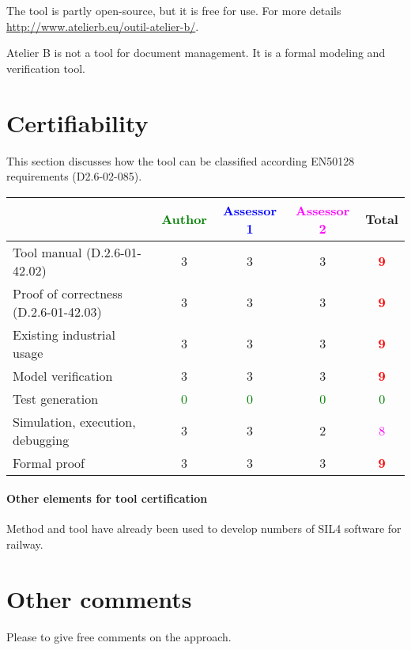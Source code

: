 \begin{author_comment}
The tool is partly open-source, but it is free for use.
For more details \url{http://www.atelierb.eu/outil-atelier-b/}.
\end{author_comment}


\begin{assessor2}
Atelier B is not a tool for document management. It is a formal modeling and verification tool.
\end{assessor2}

\section{Certifiability}

This section discusses how the tool can be classified according EN50128 requirements (D2.6-02-085).


\begin{tabular}{|l | c | c | c | c|}
\hline
& \textcolor{green}{Author} & \textcolor{blue}{Assessor 1} & \textcolor{magenta}{Assessor 2} & Total \\
\hline 
Tool manual (D.2.6-01-42.02) & 3     & 3     & 3     & \textcolor{red}{\textbf{9}} \\
\hline
Proof of correctness (D.2.6-01-42.03)   & 3     & 3     & 3     & \textcolor{red}{\textbf{9}} \\
\hline
Existing industrial  usage  & 3      & 3     & 3     & \textcolor{red}{\textbf{9}} \\
\hline
Model verification & 3     & 3     & 3     & \textcolor{red}{\textbf{9}} \\
\hline
Test generation & \textcolor{green}{0} & \textcolor{green}{0} & \textcolor{green}{0} & \textcolor{green}{0} \\
\hline
Simulation, execution, debugging & 3     & 3     & 2     & \textcolor{magenta}{8} \\
\hline
Formal proof & 3     & 3     & 3     & \textcolor{red}{\textbf{9}} \\
\hline
\end{tabular}

\paragraph{Other elements for tool certification}


\begin{author_comment}
Method and tool have already been used to  develop numbers of  SIL4 software for railway.
\end{author_comment}


\section{Other comments}
Please to  give free comments on the approach.
